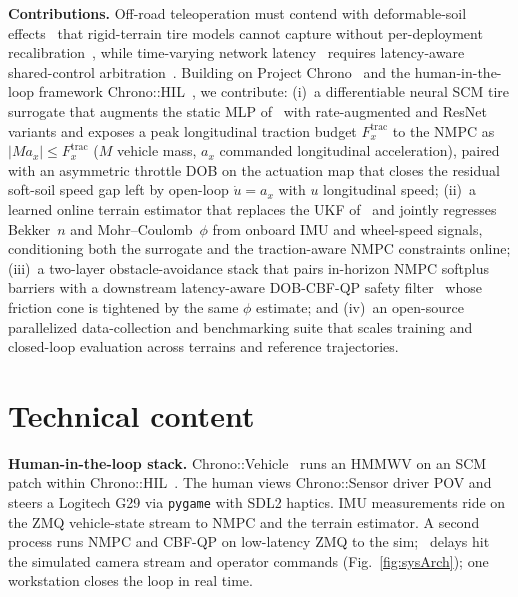 \documentclass{acmd2026_abstract}
\begin{document}
\vspace{2pt}
\noindent\textbf{Contributions.}  Off-road
teleoperation must contend with deformable-soil effects~\cite{Bekker69}
that rigid-terrain tire models cannot capture without per-deployment
recalibration~\cite{Dallas21}, while time-varying network
latency~\cite{Choi23} requires latency-aware shared-control
arbitration~\cite{Zhang25}.  Building on Project Chrono~\cite{Tasora16} and
the human-in-the-loop framework Chrono::HIL~\cite{Zhou23}, we contribute: (i)~a differentiable
neural SCM tire surrogate that augments the static MLP
of~\cite{Dallas21} with rate-augmented and ResNet variants and
exposes a peak longitudinal traction budget $F_x^{\mathrm{trac}}$
to the NMPC as $|M a_x|\!\le\!F_x^{\mathrm{trac}}$ ($M$ vehicle
mass, $a_x$ commanded longitudinal acceleration), paired with an
asymmetric throttle DOB on the actuation map that closes the
residual soft-soil speed gap left by open-loop $\dot u\!=\!a_x$
with $u$ longitudinal speed;
(ii)~a learned online terrain estimator that
replaces the UKF of~\cite{Dallas21} and jointly regresses
Bekker~$n$ and Mohr--Coulomb~$\phi$ from onboard IMU and
wheel-speed signals, conditioning both the surrogate and the
traction-aware NMPC constraints online; (iii)~a two-layer obstacle-avoidance
stack that pairs in-horizon NMPC softplus barriers with a
downstream latency-aware DOB-CBF-QP safety
filter~\cite{Zhang25} whose friction cone is tightened by the same
$\phi$ estimate; and (iv)~an open-source parallelized
data-collection and benchmarking suite that scales training and
closed-loop evaluation across terrains and reference trajectories.

\section*{Technical content}
\vspace{-4pt}

\noindent\textbf{Human-in-the-loop stack.}  Chrono::Vehicle~\cite{Serban19}
runs an HMMWV on an SCM patch within Chrono::HIL~\cite{Zhou23}.
The human views Chrono::Sensor driver POV and steers a Logitech G29
via \texttt{pygame} with SDL2 haptics.  IMU measurements ride on the
ZMQ vehicle-state stream to NMPC and the terrain estimator.  A second
process runs NMPC and CBF-QP on low-latency ZMQ to the sim;~\cite{Choi23}
delays hit the simulated camera stream and operator commands
(Fig.~\ref{fig:sysArch}); one workstation closes the loop in real
time.
\end{document}
